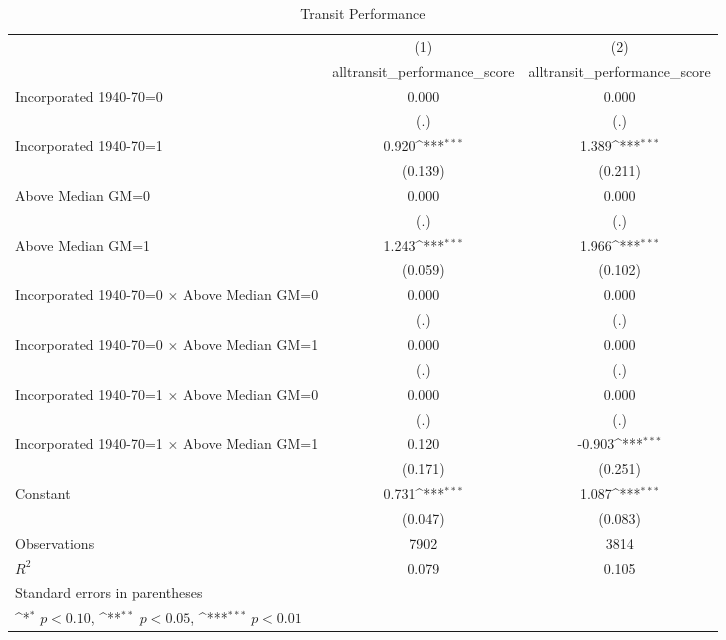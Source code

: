 \begin{table}[htbp]\centering
\def\sym#1{\ifmmode^{#1}\else\(^{#1}\)\fi}
\caption{Transit Performance}
\begin{tabular}{l*{2}{c}}
\hline\hline
                    &\multicolumn{1}{c}{(1)}&\multicolumn{1}{c}{(2)}\\
                    &\multicolumn{1}{c}{alltransit\_performance\_score}&\multicolumn{1}{c}{alltransit\_performance\_score}\\
\hline
Incorporated 1940-70=0&       0.000         &       0.000         \\
                    &         (.)         &         (.)         \\
[1em]
Incorporated 1940-70=1&       0.920\sym{***}&       1.389\sym{***}\\
                    &     (0.139)         &     (0.211)         \\
[1em]
Above Median GM=0   &       0.000         &       0.000         \\
                    &         (.)         &         (.)         \\
[1em]
Above Median GM=1   &       1.243\sym{***}&       1.966\sym{***}\\
                    &     (0.059)         &     (0.102)         \\
[1em]
Incorporated 1940-70=0 $\times$ Above Median GM=0&       0.000         &       0.000         \\
                    &         (.)         &         (.)         \\
[1em]
Incorporated 1940-70=0 $\times$ Above Median GM=1&       0.000         &       0.000         \\
                    &         (.)         &         (.)         \\
[1em]
Incorporated 1940-70=1 $\times$ Above Median GM=0&       0.000         &       0.000         \\
                    &         (.)         &         (.)         \\
[1em]
Incorporated 1940-70=1 $\times$ Above Median GM=1&       0.120         &      -0.903\sym{***}\\
                    &     (0.171)         &     (0.251)         \\
[1em]
Constant            &       0.731\sym{***}&       1.087\sym{***}\\
                    &     (0.047)         &     (0.083)         \\
\hline
Observations        &        7902         &        3814         \\
\(R^{2}\)           &       0.079         &       0.105         \\
\hline\hline
\multicolumn{3}{l}{\footnotesize Standard errors in parentheses}\\
\multicolumn{3}{l}{\footnotesize \sym{*} \(p<0.10\), \sym{**} \(p<0.05\), \sym{***} \(p<0.01\)}\\
\end{tabular}
\end{table}
